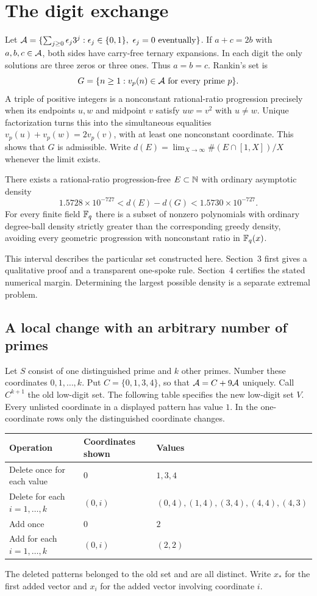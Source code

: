 \section{The digit exchange}
Let $\Ag=\{\sum_{j\ge0}\epsilon_j3^j:\epsilon_j\in\{0,1\},\ \epsilon_j=0
\text{ eventually}\}$. If $a+c=2b$ with $a,b,c\in\mathcal A$, both sides have carry-free ternary expansions. In each digit the only solutions are three zeros or three ones. Thus $a=b=c$. Rankin's set is
\[
 G=\{n\ge1:v_p(n)\in\mathcal A\text{ for every prime }p\}.
\]
A triple of positive integers is a nonconstant rational-ratio progression precisely when its endpoints $u,w$ and midpoint $v$ satisfy $uw=v^2$ with $u\ne w$. Unique factorization turns this into the simultaneous equalities $v_p(u)+v_p(w)=2v_p(v)$, with at least one nonconstant coordinate. This shows that $G$ is admissible. Write $d(E)=\lim_{X\to\infty}\#(E\cap[1,X])/X$ whenever the limit exists.

\begin{theorem}\label{th:main}
There exists a rational-ratio progression-free $E\subset\mathbb N$ with ordinary asymptotic density
\[
                        1.5728\times10^{-727}<d(E)-d(G)<1.5730\times10^{-727}.
\]
For every finite field $\mathbb F_q$ there is a subset of nonzero polynomials with ordinary degree-ball density strictly greater than the corresponding greedy density, avoiding every geometric progression with nonconstant ratio in $\mathbb F_q(x)$.
\end{theorem}
This interval describes the particular set constructed here. Section~3 first gives a qualitative proof and a transparent one-spoke rule. Section~4 certifies the stated numerical margin. Determining the largest possible density is a separate extremal problem.

\subsection*{A local change with an arbitrary number of primes}
Let $S$ consist of one distinguished prime and $k$ other primes. Number these coordinates $0,1,\ldots,k$. Put $C=\{0,1,3,4\}$, so that $\mathcal A=C+9\mathcal A$ uniquely. Call $C^{k+1}$ the old low-digit set. The following table specifies the new low-digit set $V$. Every unlisted coordinate in a displayed pattern has value $1$. In the one-coordinate rows only the distinguished coordinate changes.
\begin{center}
\begin{tabular}{@{}lll@{}}\toprule
Operation & Coordinates shown & Values \\ \midrule
Delete once for each value & $0$ & $1,3,4$ \\
Delete for each $i=1,\ldots,k$ & $(0,i)$ & $(0,4),(1,4),(3,4),(4,4),(4,3)$ \\
Add once & $0$ & $2$ \\
Add for each $i=1,\ldots,k$ & $(0,i)$ & $(2,2)$ \\ \bottomrule
\end{tabular}
\end{center}
The deleted patterns belonged to the old set and are all distinct. Write $x_*$ for the first added vector and $x_i$ for the added vector involving coordinate $i$.


